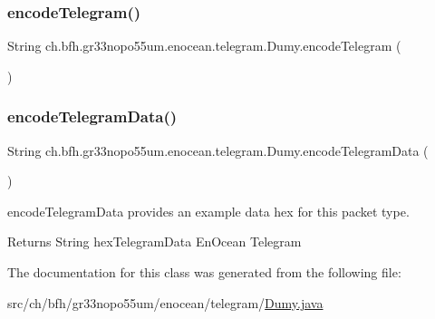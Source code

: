 \subsubsection{\texorpdfstring{encode\+Telegram()}{encodeTelegram()}}
{\footnotesize\ttfamily String ch.\+bfh.\+gr33nopo55um.\+enocean.\+telegram.\+Dumy.\+encode\+Telegram (\begin{DoxyParamCaption}{ }\end{DoxyParamCaption})}

\hypertarget{classch_1_1bfh_1_1gr33nopo55um_1_1enocean_1_1telegram_1_1_dumy_a1fb8aa19a984b3bef0704aa830c9ee64}{}\label{classch_1_1bfh_1_1gr33nopo55um_1_1enocean_1_1telegram_1_1_dumy_a1fb8aa19a984b3bef0704aa830c9ee64} 
\subsubsection{\texorpdfstring{encode\+Telegram\+Data()}{encodeTelegramData()}}
{\footnotesize\ttfamily String ch.\+bfh.\+gr33nopo55um.\+enocean.\+telegram.\+Dumy.\+encode\+Telegram\+Data (\begin{DoxyParamCaption}{ }\end{DoxyParamCaption})}

encode\+Telegram\+Data provides an example data hex for this packet type.

\begin{DoxyReturn}{Returns}
String hex\+Telegram\+Data En\+Ocean Telegram 
\end{DoxyReturn}


The documentation for this class was generated from the following file\+:\begin{DoxyCompactItemize}
\item 
src/ch/bfh/gr33nopo55um/enocean/telegram/\hyperlink{_dumy_8java}{Dumy.\+java}\end{DoxyCompactItemize}
